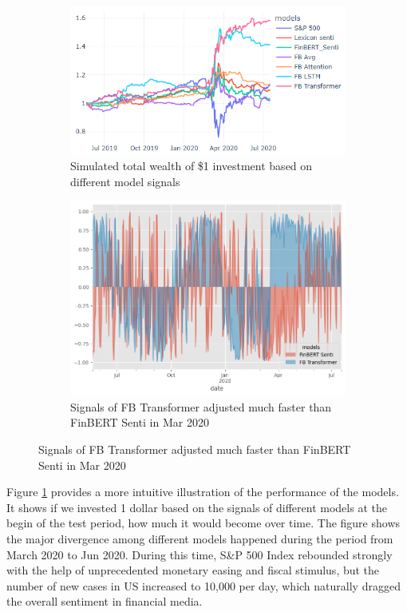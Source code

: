 \documentclass[11pt]{article}
\begin{document}
\begin{figure}[h!]
  \centering
  \begin{subfigure}[b]{0.4\textwidth}
    \includegraphics[width=\textwidth]{total_returns.png}
    \caption{Simulated total wealth of \$1 investment based on different model signals}
    \label{fig:total_return}
  \end{subfigure}
  \begin{subfigure}[b]{0.4\textwidth}
    \includegraphics[width=\textwidth]{signal_compare.png}
    \caption{Signals of FB Transformer adjusted much faster than FinBERT Senti in Mar 2020}
    \label{fig:signal_compare}
  \end{subfigure}
\end{figure}

Figure \ref{fig:total_return} provides a more intuitive illustration of the performance of the models. It shows if we invested 1 dollar based on the signals of different models at the begin of the test period, how much it would become over time. The figure shows the major divergence among different models happened during the period from March 2020 to Jun 2020. During this time, S\&P 500 Index rebounded strongly with the help of unprecedented monetary easing and fiscal stimulus, but the number of new cases in US increased to 10,000 per day, which naturally dragged the overall sentiment in financial media. 
\end{document}
